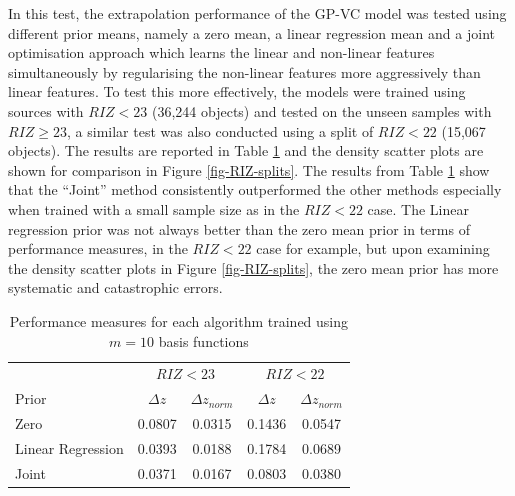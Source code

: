 \documentclass[useAMS,usenatbib,fleqn]{mn2e}
\begin{document}
In this test, the extrapolation performance of the GP-VC model was tested using different prior means, namely a zero mean, a linear regression mean and a joint optimisation approach which learns the linear and non-linear features simultaneously by regularising the non-linear features more aggressively than linear features. To test this more effectively,  the models were trained using sources with $RIZ<23$ (36,244 objects) and tested on the unseen samples with $RIZ\ge23$, a similar test was also conducted using a split of $RIZ<22$ (15,067 objects). The results are reported in Table \ref{table-RIZ-splits} and the density scatter plots are shown for comparison in Figure \ref{fig-RIZ-splits}. The results from Table \ref{table-RIZ-splits} show that the ``Joint'' method consistently outperformed the other methods especially when trained with a small sample size as in the $RIZ<22$ case. The Linear regression prior was not always better than the zero mean prior in terms of performance measures, in the $RIZ<22$ case for example, but upon examining the density scatter plots in Figure \ref{fig-RIZ-splits}, the zero mean prior has more systematic and catastrophic errors.

 \begin{table}
\caption{Performance measures for each algorithm trained using $m=10$ basis functions}
\begin{center}
  \begin{tabular}{| l | c | c | c | c | }
  							& 	\multicolumn{2}{|c|}{$RIZ<23$}				& 	\multicolumn{2}{c}{$RIZ<22$} \\ \cline{2-5}
     	Prior						&	$\Delta z$		&	$\Delta z_{norm}$		&	$\Delta z$		&	$\Delta z_{norm}$	\\	\hline
	Zero						&	0.0807		&	0.0315				&	0.1436		&	0.0547					\\
	Linear Regression			&	0.0393		&	0.0188				&	0.1784		&	0.0689					\\
	Joint						&	0.0371		&	0.0167				&	0.0803		&	0.0380					\\	\hline
  \end{tabular}
  \label{table-RIZ-splits}
\end{center}
\end{table}
\end{document}
